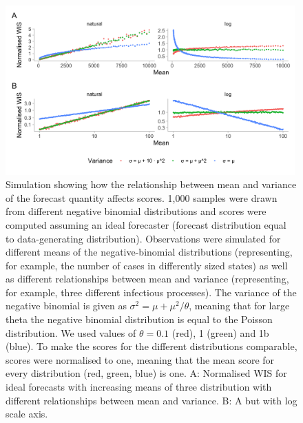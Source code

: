\documentclass{article}
\begin{document}
\begin{figure}[h!]
    \centering
    \includegraphics[width=0.99\textwidth]{output/figures/SIM-mean-state-size.png}
    \caption{Simulation showing how the relationship between mean and variance of the forecast quantity affects scores. 1,000 samples were drawn from different negative binomial distributions and scores were computed assuming an ideal forecaster (forecast distribution equal to data-generating distribution). Observations were simulated for different means of the negative-binomial distributions (representing, for example, the number of cases in differently sized states) as well as different relationships between mean and variance (representing, for example, three different infectious processes). The variance of the negative binomial is given as $\sigma^2 = \mu + \mu^2 / \theta$, meaning that for large theta the negative binomial distribution is equal to the Poisson distribution. We used values of $\theta = 0.1$ (red), 1 (green) and 1b (blue). To make the scores for the different distributions comparable, scores were normalised to one, meaning that the mean score for every distribution (red, green, blue) is one. 
    A: Normalised WIS for ideal forecasts with increasing means of three distribution with different relationships between mean and variance. B: A but with log scale axis.}
    \label{fig:SIM-wis-state-size-mean}
\end{figure}
\end{document}
